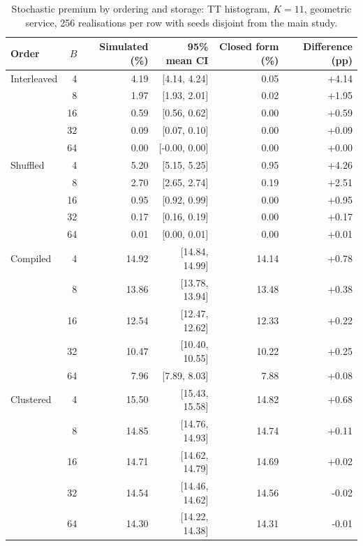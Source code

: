 \begin{table}[htbp]
\centering\footnotesize
\begin{tabular}{lrrrrr}
\toprule
Order & $B$ & Simulated (\%) & 95\% mean CI & Closed form (\%) & Difference (pp)\\\midrule
Interleaved & 4 & 4.19 & [4.14, 4.24] & 0.05 & +4.14\\
 & 8 & 1.97 & [1.93, 2.01] & 0.02 & +1.95\\
 & 16 & 0.59 & [0.56, 0.62] & 0.00 & +0.59\\
 & 32 & 0.09 & [0.07, 0.10] & 0.00 & +0.09\\
 & 64 & 0.00 & [-0.00, 0.00] & 0.00 & +0.00\\
Shuffled & 4 & 5.20 & [5.15, 5.25] & 0.95 & +4.26\\
 & 8 & 2.70 & [2.65, 2.74] & 0.19 & +2.51\\
 & 16 & 0.95 & [0.92, 0.99] & 0.00 & +0.95\\
 & 32 & 0.17 & [0.16, 0.19] & 0.00 & +0.17\\
 & 64 & 0.01 & [0.00, 0.01] & 0.00 & +0.01\\
Compiled & 4 & 14.92 & [14.84, 14.99] & 14.14 & +0.78\\
 & 8 & 13.86 & [13.78, 13.94] & 13.48 & +0.38\\
 & 16 & 12.54 & [12.47, 12.62] & 12.33 & +0.22\\
 & 32 & 10.47 & [10.40, 10.55] & 10.22 & +0.25\\
 & 64 & 7.96 & [7.89, 8.03] & 7.88 & +0.08\\
Clustered & 4 & 15.50 & [15.43, 15.58] & 14.82 & +0.68\\
 & 8 & 14.85 & [14.76, 14.93] & 14.74 & +0.11\\
 & 16 & 14.71 & [14.62, 14.79] & 14.69 & +0.02\\
 & 32 & 14.54 & [14.46, 14.62] & 14.56 & -0.02\\
 & 64 & 14.30 & [14.22, 14.38] & 14.31 & -0.01\\
\bottomrule
\end{tabular}
\caption{Stochastic premium by ordering and storage: TT histogram, $K=11$, geometric service, 256 realisations per row with seeds disjoint from the main study.}
\label{tab:orderbuffer}
\end{table}
